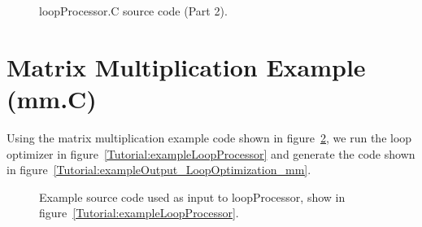 \begin{figure}[!h]
{\indent
{\mySmallFontSize


\begin{latexonly}
   
\end{latexonly}

\begin{htmlonly}
   
\end{htmlonly}

}
}
\caption{loopProcessor.C source code (Part 2).}
\label{Tutorial:exampleLoopProcessor2}
\end{figure}

\section{Matrix Multiplication Example (mm.C)}

   Using the matrix multiplication example code shown in 
figure~\ref{Tutorial:exampleInputCode_LoopOptimization_mm}, we run the loop optimizer in
figure~\ref{Tutorial:exampleLoopProcessor} and generate the code shown in 
figure~\ref{Tutorial:exampleOutput_LoopOptimization_mm}.

\begin{figure}[!h]
{\indent
{\mySmallFontSize


\begin{latexonly}
   
\end{latexonly}

\begin{htmlonly}
   
\end{htmlonly}

}
}
\caption{Example source code used as input to loopProcessor, show in figure~\ref{Tutorial:exampleLoopProcessor}.}
\label{Tutorial:exampleInputCode_LoopOptimization_mm}
\end{figure}

